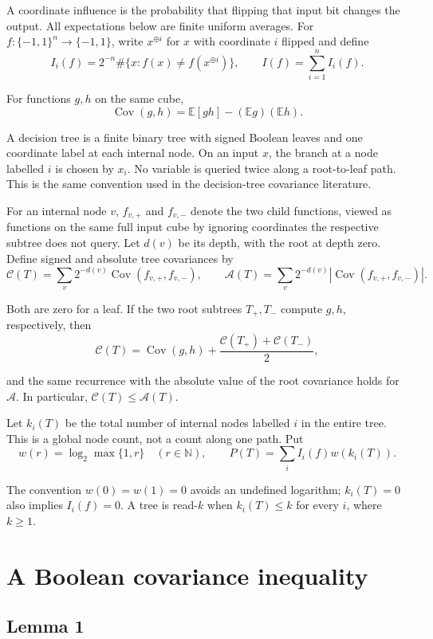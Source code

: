 \documentclass[
  american,
  11pt,
]{article}
\begin{document}
A coordinate influence is the probability that flipping that input bit
changes the output. All expectations below are finite uniform averages.
For \(f:\{-1,1\}^n\to\{-1,1\}\), write \(x^{\oplus i}\) for \(x\) with
coordinate \(i\) flipped and define \[
I_i(f)=2^{-n}\#\{x:f(x)\ne f(x^{\oplus i})\},
\qquad I(f)=\sum_{i=1}^n I_i(f).
\]

For functions \(g,h\) on the same cube, \[
\operatorname{Cov}(g,h)=\mathbb E[gh]-(\mathbb E g)(\mathbb E h).
\]

A decision tree is a finite binary tree with signed Boolean leaves and
one coordinate label at each internal node. On an input \(x\), the
branch at a node labelled \(i\) is chosen by \(x_i\). No
variable is queried twice along a root-to-leaf path. This is the same
convention used in the decision-tree covariance literature.

For an internal node \(v\), \(f_{v,+}\) and \(f_{v,-}\) denote the two
child functions, viewed as functions on the same full input cube by
ignoring coordinates the respective subtree does not query. Let \(d(v)\)
be its depth, with the root at depth zero. Define signed and absolute
tree covariances by \[
\mathcal C(T)=\sum_v2^{-d(v)}\operatorname{Cov}(f_{v,+},f_{v,-}),
\qquad
\mathcal A(T)=\sum_v2^{-d(v)}|\operatorname{Cov}(f_{v,+},f_{v,-})|.
\]

Both are zero for a leaf. If the two root subtrees \(T_+,T_-\) compute
\(g,h\), respectively, then \[
\mathcal C(T)=\operatorname{Cov}(g,h)+\frac{\mathcal C(T_+)+\mathcal C(T_-)}2,
\]

and the same recurrence with the absolute value of the root covariance
holds for \(\mathcal A\). In particular,
\(\mathcal C(T)\leq\mathcal A(T)\).

Let \(k_i(T)\) be the total number of internal nodes labelled \(i\) in
the entire tree. This is a global node count, not a count along one
path. Put \[
w(r)=\log_2\max\{1,r\}\quad(r\in\mathbb N),
\qquad
P(T)=\sum_i I_i(f)w(k_i(T)).
\]

The convention \(w(0)=w(1)=0\) avoids an undefined logarithm;
\(k_i(T)=0\) also implies \(I_i(f)=0\). A tree is read-\(k\) when
\(k_i(T)\leq k\) for every \(i\), where \(k\geq1\).

\section{A Boolean covariance
inequality}\label{a-boolean-covariance-inequality}

\subsection*{Lemma 1}\label{lemma-1}
\end{document}
